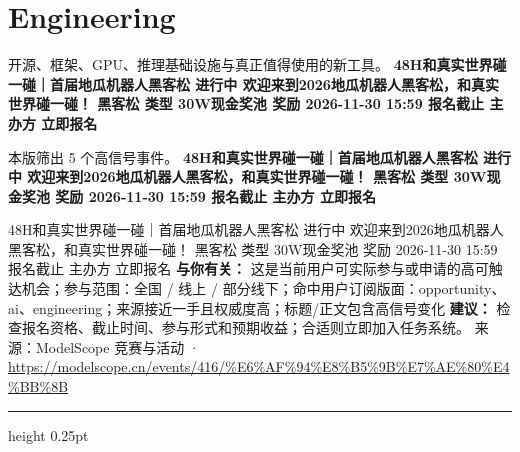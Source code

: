 \documentclass[10.5pt]{ctexart}
\begin{document}
\section*{Engineering}
{\color{ormuted} 开源、框架、GPU、推理基础设施与真正值得使用的新工具。}
\vspace{2mm}
{\LARGE\bfseries 48H和真实世界碰一碰｜首届地瓜机器人黑客松 进行中 欢迎来到2026地瓜机器人黑客松，和真实世界碰一碰！ 黑客松 类型 30W现金奖池 奖励 2026-11-30 15:59 报名截止 主办方 立即报名}\par
\vspace{1mm}
{\color{ormuted} 本版筛出 5 个高信号事件。}
\vspace{3mm}
{\Large\bfseries 48H和真实世界碰一碰｜首届地瓜机器人黑客松 进行中 欢迎来到2026地瓜机器人黑客松，和真实世界碰一碰！ 黑客松 类型 30W现金奖池 奖励 2026-11-30 15:59 报名截止 主办方 立即报名}\par
48H和真实世界碰一碰｜首届地瓜机器人黑客松 进行中 欢迎来到2026地瓜机器人黑客松，和真实世界碰一碰！ 黑客松 类型 30W现金奖池 奖励 2026-11-30 15:59 报名截止 主办方 立即报名
\textbf{与你有关：} 这是当前用户可实际参与或申请的高可触达机会；参与范围：全国 / 线上 / 部分线下；命中用户订阅版面：opportunity、ai、engineering；来源接近一手且权威度高；标题/正文包含高信号变化
\textbf{建议：} 检查报名资格、截止时间、参与形式和预期收益；合适则立即加入任务系统。
{\footnotesize\color{ormuted} 来源：ModelScope 竞赛与活动 · \url{https://modelscope.cn/events/416/%E6%AF%94%E8%B5%9B%E7%AE%80%E4%BB%8B}}
\vspace{4mm}
\hrule height 0.25pt
\vspace{3mm}
\end{document}
